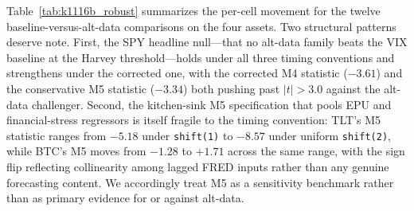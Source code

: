 \documentclass[12pt,a4paper]{article}
\begin{document}
Table~\ref{tab:k1116b_robust} summarizes the per-cell movement for the twelve baseline-versus-alt-data comparisons on the four assets. Two structural patterns deserve note. First, the SPY headline null---that no alt-data family beats the VIX baseline at the Harvey threshold---holds under all three timing conventions and strengthens under the corrected one, with the corrected M4 statistic ($-3.61$) and the conservative M5 statistic ($-3.34$) both pushing past $|t|>3.0$ against the alt-data challenger. Second, the kitchen-sink M5 specification that pools EPU and financial-stress regressors is itself fragile to the timing convention: TLT's M5 statistic ranges from $-5.18$ under \texttt{shift(1)} to $-8.57$ under uniform \texttt{shift(2)}, while BTC's M5 moves from $-1.28$ to $+1.71$ across the same range, with the sign flip reflecting collinearity among lagged FRED inputs rather than any genuine forecasting content. We accordingly treat M5 as a sensitivity benchmark rather than as primary evidence for or against alt-data.
\end{document}
